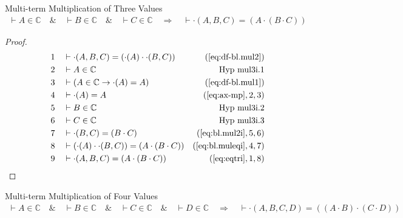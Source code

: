 \begin{lemma} {Multi-term Multiplication of Three Values}
\begin{align}
\vdash A \in \mathbb{C}\quad\&\quad \vdash B \in \mathbb{C}\quad\&\quad \vdash
    C \in \mathbb{C}\quad\Rightarrow\quad \vdash \cdot( A , B , C ) = ( A \cdot
    ( B \cdot C ) )\label{eq:bl.mul3i}\tag{bl.mul3i}
\end{align}
\end{lemma}


\begin{proof}
\begin{align}
  1 &&  & \vdash \cdot( A , B , C ) = ( \cdot( A ) \cdot \cdot( B , C )
     )&(\mbox{\ref{eq:df-bl.mul2}})\notag
  \\ 2 &&  & \vdash A \in \mathbb{C}&\text{Hyp~mul3i.1}\notag%
  \\ 3 &&  & \vdash ( A \in \mathbb{C} \rightarrow \cdot( A ) = A
     )&(\mbox{\ref{eq:df-bl.mul1}})\notag
  \\ 4 &&  & \vdash \cdot( A ) = A&(\mbox{\ref{eq:ax-mp}},2,3)\notag
  \\ 5 &&  & \vdash B \in \mathbb{C}&\text{Hyp~mul3i.2}\notag%
  \\ 6 &&  & \vdash C \in \mathbb{C}&\text{Hyp~mul3i.3}\notag%
  \\ 7 &&  & \vdash \cdot( B , C ) = ( B \cdot C
     )&(\mbox{\ref{eq:bl.mul2i}},5,6)\notag
  \\ 8 &&  & \vdash ( \cdot( A ) \cdot \cdot( B , C ) ) = ( A \cdot ( B \cdot C
     ) )&(\mbox{\ref{eq:bl.muleqi}},4,7)\notag
  \\ 9 &&  & \vdash \cdot( A , B , C ) = ( A \cdot ( B \cdot C )
     )&(\mbox{\ref{eq:eqtri}},1,8)\notag
\end{align}
\end{proof}

\begin{lemma} {Multi-term Multiplication of Four Values}
\begin{align}
\vdash A \in \mathbb{C}\quad\&\quad \vdash B \in \mathbb{C}\quad\&\quad \vdash
    C \in \mathbb{C}\quad\&\quad \vdash D \in \mathbb{C}\quad\Rightarrow\quad
    \vdash \cdot( A , B , C , D ) = ( ( A \cdot B ) \cdot ( C \cdot D )
    )\label{eq:bl.mul4i}\tag{bl.mul4i}
\end{align}
\end{lemma}


